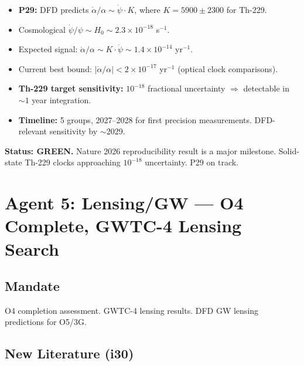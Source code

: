 \documentclass[11pt,a4paper]{article}
\newcommand{\GREEN}{\textcolor{dfdgreen}{\textbf{GREEN}}}
\begin{document}
\begin{itemize}
\item \textbf{P29:} DFD predicts $\dot{\alpha}/\alpha \sim \dot{\psi} \cdot K$, where $K = 5900 \pm 2300$ for Th-229.
\item Cosmological $\dot{\psi}/\psi \sim H_0 \sim 2.3 \times 10^{-18}$ s$^{-1}$.
\item Expected signal: $\dot{\alpha}/\alpha \sim K \cdot \dot{\psi} \sim 1.4 \times 10^{-14}$ yr$^{-1}$.
\item Current best bound: $|\dot{\alpha}/\alpha| < 2 \times 10^{-17}$ yr$^{-1}$ (optical clock comparisons).
\item \textbf{Th-229 target sensitivity:} $10^{-18}$ fractional uncertainty $\Rightarrow$ detectable in $\sim 1$ year integration.
\item \textbf{Timeline:} 5 groups, 2027--2028 for first precision measurements. DFD-relevant sensitivity by $\sim$2029.
\end{itemize}

\textbf{Status: \GREEN.} Nature 2026 reproducibility result is a major milestone. Solid-state Th-229 clocks approaching $10^{-18}$ uncertainty. P29 on track.

\section{Agent 5: Lensing/GW --- O4 Complete, GWTC-4 Lensing Search}

\subsection{Mandate}
O4 completion assessment. GWTC-4 lensing results. DFD GW lensing predictions for O5/3G.

\subsection{New Literature (i30)}
\end{document}
